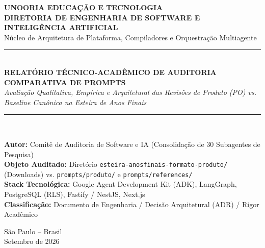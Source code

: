 \documentclass[11pt,a4paper]{article}
\begin{document}
\begin{titlepage}
    \centering
    \vspace*{1cm}
    {\Huge \textbf{\color{NavyBlue}UNOORIA EDUCAÇÃO E TECNOLOGIA}}\\[0.4cm]
    {\large \textbf{\color{SteelBlue}DIRETORIA DE ENGENHARIA DE SOFTWARE E INTELIGÊNCIA ARTIFICIAL}}\\[0.2cm]
    {\normalsize Núcleo de Arquitetura de Plataforma, Compiladores e Orquestração Multiagente}\\[2.5cm]
    
    {\rule{\linewidth}{1.5pt}}\\[0.6cm]
    {\huge \bfseries \color{NavyBlue}RELATÓRIO TÉCNICO-ACADÊMICO DE AUDITORIA COMPARATIVA DE PROMPTS}\\[0.4cm]
    {\Large \itshape Avaliação Qualitativa, Empírica e Arquitetural das Revisões de Produto (PO) vs. Baseline Canônica na Esteira de Anos Finais}\\[0.6cm]
    {\rule{\linewidth}{1.5pt}}\\[2.5cm]
    
    \begin{minipage}{0.85\linewidth}
        \textbf{Autor:} Comitê de Auditoria de Software e IA (Consolidação de 30 Subagentes de Pesquisa) \\
        \textbf{Objeto Auditado:} Diretório \texttt{esteira-anosfinais-formato-produto/} (Downloads) vs. \texttt{prompts/produto/} e \texttt{prompts/references/} \\
        \textbf{Stack Tecnológica:} Google Agent Development Kit (ADK), LangGraph, PostgreSQL (RLS), Fastify / NestJS, Next.js \\
        \textbf{Classificação:} Documento de Engenharia / Decisão Arquitetural (ADR) / Rigor Acadêmico
    \end{minipage}
    
    \vfill
    {\large São Paulo -- Brasil}\\[0.2cm]
    {\large Setembro de 2026}
\end{titlepage}

\newpage
\tableofcontents
\newpage

\end{document}
